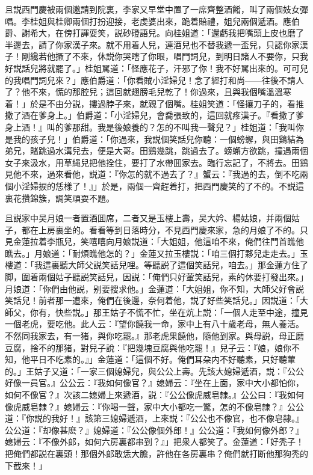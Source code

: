 且説西門慶被兩個邀請到院裏，李家又早堂中置了一席齊整酒餚，叫了兩個妓女彈唱。李桂姐與桂卿兩個打扮迎接，老虔婆出來，跪着賠禮，姐兒兩個遞酒。應伯爵、謝希大，在傍打諢耍笑，説砂磴語兒。向桂姐道：「還虧我把嘴頭上皮也磨了半邊去，請了你家漢子來。就不用着人兒，連酒兒也不替我遞一盃兒，只認你家漢子！剛纔若他撅了不來，休説你哭瞎了你眼，唱門詞兒，到明日諸人不要你，只我好説話兒將就罷了。」桂姐駡道：「怪應花子，汗邪了你！我不好駡出來的。可可兒的我唱門詞兒來？」應伯爵道：「你看賊小淫婦兒！念了經打和尚——往後不請人了？他不來，慌的那腔兒；這回就翅膀毛兒乾了！你過來，且與我個嘴溫溫寒着！」於是不由分説，摟過脖子來，就親了個嘴。桂姐笑道：「怪攘刀子的，看推撒了酒在爹身上。」伯爵道：「小淫婦兒，會喬張致的，這回就疼漢子。『看撒了爹身上酒！』叫的爹那甜。我是後娘養的？怎的不叫我一聲兒？」桂姐道：「我叫你是我的孩子兒！」伯爵道：「你過來，我説個笑話兒你聽：一個螃蠏，與田鷄結為弟兄，賭跳過水溝兒去，便是大哥。田鷄幾跳，跳過去了。螃蠏方欲跳，撞遇兩個女子來汲水，用草䋲兒把他拴住，要打了水帶囬家去。臨行忘記了，不將去。田鷄見他不來，過來看他，説道：『你怎的就不過去了？』蟹云：『我過的去，倒不吃兩個小淫婦捩的恁樣了！』」於是，兩個一齊趕着打，把西門慶笑的了不的。不説這裏花攢錦簇，調笑頑耍不題。

且説家中吴月娘一者置酒囬席，二者又是玉樓上壽，吴大妗、楊姑娘，并兩個姑子，都在上房裏坐的。看看等到日落時分，不見西門慶來家，急的月娘了不的。只見金蓮拉着李瓶兒，笑嘻嘻向月娘説道：「大姐姐，他這咱不來，俺們往門首瞧他瞧去。」月娘道：「耐煩瞧他怎的？」金蓮又拉玉樓説：「咱三個打夥兒走走去。」玉樓道：「我這裏聽大師父説笑話兒哩。等聽説了這個笑話兒，咱去。」那金蓮方住了脚，圍着兩個姑子聽説笑話兒，因説：「俺們只好葷笑話兒，素的休要打發出來。」月娘道：「你們由他説，别要搜求他。」金蓮道：「大姐姐，你不知，大師父好會説笑話兒！前者那一遭來，俺們在後邊，奈何着他，説了好些笑話兒。」因説道：「大師父，你有，快些説。」那王姑子不慌不忙，坐在炕上説：「一個人走至中途，撞見一個老虎，要吃他。此人云：『望你饒我一命，家中上有八十歲老母，無人養活。不然同我家去，有一猪，與你吃罷。』那老虎果饒他，隨他到家。與母説，母正磨豆腐，捨不的那猪，對兒子說：『把幾塊豆腐與他吃罷！』兒子云：『娘，娘你不知，他平日不吃素的。』」金蓮道：「這個不好。俺們耳朶内不好聽素，只好聽葷的。」王姑子又道：「一家三個媳婦兒，與公公上壽。先該大媳婦遞酒，説：『公公好像一員官。』公公云：『我如何像官？』媳婦云：『坐在上面，家中大小都怕你，如何不像官？』次該二媳婦上來遞酒，説：『公公像虎威皂隸。』公公曰：『我如何像虎威皂隸？』媳婦云：『你喝一聲，家中大小都吃一驚，怎的不像皂隸？』公公道：『你説的我好！』該第三媳婦遞酒，上來説：『公公也不像官，也不像皂隸。』公公道：『却像甚麽？』媳婦道：『公公像個外郎！』公公道：『我如何像外郎？』媳婦云：『不像外郎，如何六房裏都串到？』」把衆人都笑了。金蓮道：「好秃子！把俺們都説在裏頭！那個外郎敢恁大膽，許他在各房裏串？俺們就打断他那狗秃的下截來！」

